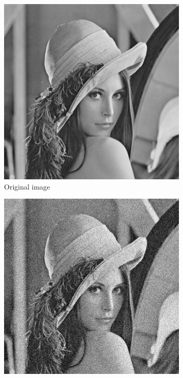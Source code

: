\documentclass{scrreprt}
\begin{document}
            \begin{figure}[!ht]
                \centering
                \begin{subfigure}[b]{0.24\textwidth}
                    \includegraphics[width=\textwidth]{img/images/lena.png}
                    \caption{Original image}
                \end{subfigure}
                \begin{subfigure}[b]{0.24\textwidth}
                    \includegraphics[width=\textwidth]{img/images/lena_gauss_noise.png}

\end{subfigure}
\end{figure}
\end{document}
